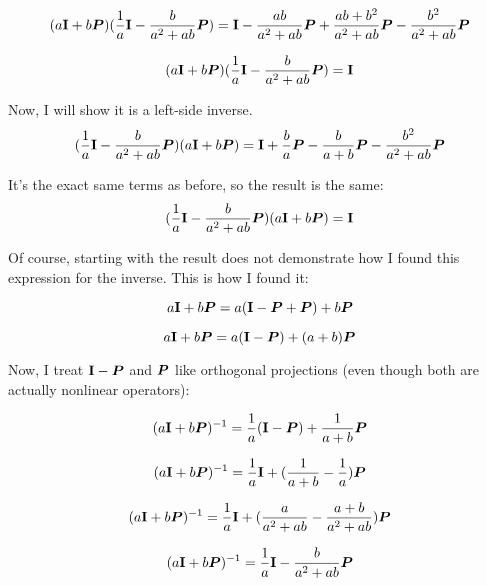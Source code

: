 \documentclass{article}
\begin{document}
\begin{equation}
(a{\bf I} + b\bm{P})(\frac{1}{a}{\bf I} - \frac{b}{a^2 + ab}\bm{P}) = {\bf I}  - \frac{ab}{a^2 + ab}\bm{P} + \frac{ab + b^2}{a^2 + ab}\bm{P} - \frac{b^2}{a^2 + ab}\bm{P}
\end{equation}

\begin{equation}
(a{\bf I} + b\bm{P})(\frac{1}{a}{\bf I} - \frac{b}{a^2 + ab}\bm{P}) = {\bf I}
\end{equation}

Now, I will show it is a left-side inverse.
\begin{equation}
(\frac{1}{a}{\bf I} - \frac{b}{a^2 + ab}\bm{P})(a{\bf I} + b\bm{P}) = {\bf I} + \frac{b}{a}\bm{P} - \frac{b}{a + b}\bm{P} - \frac{b^2}{a^2 + ab}\bm{P}
\end{equation}

It's the exact same terms as before, so the result is the same:
\begin{equation}
(\frac{1}{a}{\bf I} - \frac{b}{a^2 + ab}\bm{P})(a{\bf I} + b\bm{P}) = {\bf I}
\end{equation}

Of course, starting with the result does not demonstrate how I found this expression for the inverse.  This is how I found it:

\begin{equation}
a{\bf I} + b\bm{P}  = a({\bf I} - \bm{P} + \bm{P}) + b\bm{P}
\end{equation}

\begin{equation}
a{\bf I} + b\bm{P} = a({\bf I} - \bm{P}) + (a + b)\bm{P}
\end{equation}

Now, I treat ${\bf I} - \bm{P}$ and $\bm{P}$ like orthogonal projections (even though both are actually nonlinear operators):

\begin{equation}
(a{\bf I} + b\bm{P})^{-1} = \frac{1}{a}({\bf I} - \bm{P}) + \frac{1}{a + b}\bm{P}
\end{equation}

\begin{equation}
(a{\bf I} + b\bm{P})^{-1} = \frac{1}{a}{\bf I} + (\frac{1}{a + b} - \frac{1}{a})\bm{P}
\end{equation}

\begin{equation}
(a{\bf I} + b\bm{P})^{-1} = \frac{1}{a}{\bf I} + (\frac{a}{a^2 + ab} - \frac{a + b}{a^2 + ab})\bm{P}
\end{equation}

\begin{equation}
(a{\bf I} + b\bm{P})^{-1} = \frac{1}{a}{\bf I} - \frac{b}{a^2 + ab}\bm{P}
\end{equation}
\end{document}
